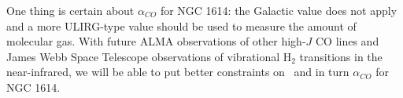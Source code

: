 One thing is certain about $\alpha_{CO}$ for NGC 1614: the Galactic value does not apply and a more ULIRG-type value should be used to measure the amount of molecular gas. With future ALMA observations of other high-$J$ CO lines and James Webb Space Telescope observations of vibrational H$_{2}$ transitions in the near-infrared, we will be able to put better constraints on \xh\ and in turn $\alpha_{CO}$ for NGC 1614.  




%
%

